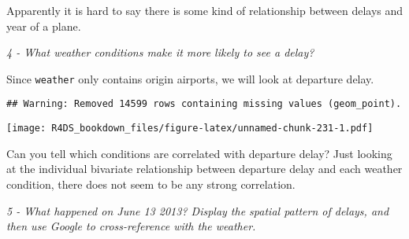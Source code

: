 \documentclass[]{article}
\newenvironment{Shaded}{\begin{snugshade}}{\end{snugshade}}
\newcommand{\KeywordTok}[1]{\textcolor[rgb]{0.13,0.29,0.53}{\textbf{#1}}}
\newcommand{\DataTypeTok}[1]{\textcolor[rgb]{0.13,0.29,0.53}{#1}}
\newcommand{\DecValTok}[1]{\textcolor[rgb]{0.00,0.00,0.81}{#1}}
\newcommand{\StringTok}[1]{\textcolor[rgb]{0.31,0.60,0.02}{#1}}
\newcommand{\OperatorTok}[1]{\textcolor[rgb]{0.81,0.36,0.00}{\textbf{#1}}}
\newcommand{\NormalTok}[1]{#1}
\theoremstyle{definition}
\theoremstyle{definition}
\theoremstyle{definition}
\theoremstyle{remark}
\begin{document}
Apparently it is hard to say there is some kind of relationship between
delays and year of a plane.

\emph{4 - What weather conditions make it more likely to see a delay?}

Since \texttt{weather} only contains origin airports, we will look at
departure delay.

\begin{Shaded}
\end{Shaded}

\begin{verbatim}
## Warning: Removed 14599 rows containing missing values (geom_point).
\end{verbatim}

\texttt{[image: R4DS\_bookdown\_files/figure-latex/unnamed-chunk-231-1.pdf]}

Can you tell which conditions are correlated with departure delay? Just
looking at the individual bivariate relationship between departure delay
and each weather condition, there does not seem to be any strong
correlation.

\emph{5 - What happened on June 13 2013? Display the spatial pattern of
delays, and then use Google to cross-reference with the weather.}
\end{document}
